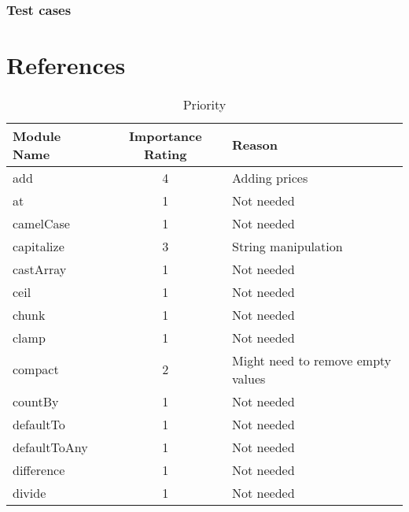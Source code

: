 \documentclass[a4paper, 12pt]{article}
\begin{document}
        \subsubsection{Test cases}

\section{References}

  

   




\begin{table}[h]\caption{Priority}\label{priorityTable}
    \centering
    \begin{tabular}{l|c|l}
    \textbf{ Module Name}  & \textbf{Importance Rating} & \textbf{Reason}                                \\ \hline
    add          & 4                 & Adding prices                         \\  \hline
    at           & 1                 & Not needed                            \\ \hline
    camelCase    & 1                 & Not needed                            \\ \hline
    capitalize   & 3                 & String manipulation                   \\ \hline
    castArray    & 1                 & Not needed                            \\ \hline
    ceil         & 1                 & Not needed                            \\ \hline
    chunk        & 1                 & Not needed                            \\ \hline
    clamp        & 1                 & Not needed                            \\ \hline
    compact      & 2                 & Might need to remove empty values     \\ \hline
    countBy      & 1                 & Not needed                            \\ \hline
    defaultTo    & 1                 & Not needed                            \\ \hline
    defaultToAny & 1                 & Not needed                            \\ \hline
    difference   & 1                 & Not needed                            \\ \hline
    divide       & 1                 & Not needed                            \\ \hline

\end{tabular}
\end{table}
\end{document}
